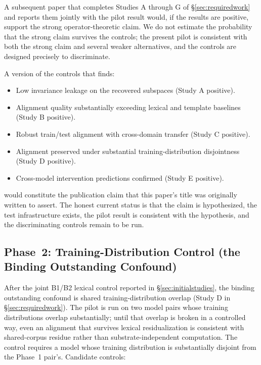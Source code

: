 A subsequent paper that completes Studies A through G of
\S\ref{sec:requiredwork} and reports them jointly with the pilot
result would, if the results are positive, support the strong
operator-theoretic claim. We do not estimate the probability that the
strong claim survives the controls; the present pilot is consistent
with both the strong claim and several weaker alternatives, and the
controls are designed precisely to discriminate.

A version of the controls that finds:

\begin{itemize}
    \item Low invariance leakage on the recovered subspaces (Study A
        positive).
    \item Alignment quality substantially exceeding lexical and
        template baselines (Study B positive).
    \item Robust train/test alignment with cross-domain transfer
        (Study C positive).
    \item Alignment preserved under substantial training-distribution
        disjointness (Study D positive).
    \item Cross-model intervention predictions confirmed (Study E
        positive).
\end{itemize}

would constitute the publication claim that this paper's title was
originally written to assert. The honest current status is that the
claim is hypothesized, the test infrastructure exists, the pilot
result is consistent with the hypothesis, and the discriminating
controls remain to be run.

\subsection{Phase~2: Training-Distribution Control (the Binding Outstanding Confound)}

After the joint B1/B2 lexical control reported in
\S\ref{sec:initialstudies}, the binding outstanding confound is
shared training-distribution overlap (Study D in
\S\ref{sec:requiredwork}). The pilot is run on two model pairs whose
training distributions overlap substantially; until that overlap is
broken in a controlled way, even an alignment that survives lexical
residualization is consistent with shared-corpus residue rather than
substrate-independent computation. The control requires a model whose
training distribution is substantially disjoint from the Phase~1
pair's. Candidate controls:

